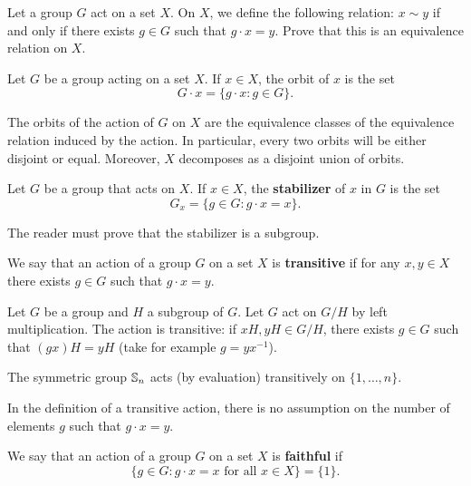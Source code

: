 \begin{exercise}
    Let a group $G$ act on a set $X$. 
    On $X$, we define the following relation: $x\sim y$ if and only if
    there exists $g\in G$ such that $g\cdot x=y$. Prove 
    that this is an equivalence relation on $X$. 
\end{exercise}

\begin{definition}
Let $G$ be a group acting on a set $X$. If $x\in X$, the
orbit of $x$ is the set
\[
G\cdot x=\{g\cdot x:g\in G\}.
\]
\end{definition}

The orbits of the action of $G$ on $X$ are 
the equivalence classes of the equivalence 
relation induced by the action. In particular, 
every two orbits will be either disjoint or equal. Moreover, 
$X$ decomposes as a disjoint union of orbits. 

\begin{definition}
        Let $G$ be a group that acts on $X$. If $x\in X$, the \textbf{stabilizer} of $x$ in $G$
        is the set   
        \[
        G_x=\{g\in G:g\cdot x=x\}.
        \]
\end{definition}

The reader must prove that the stabilizer is a subgroup. 

\begin{definition}
We say that an action of a group $G$ on a set $X$
is \textbf{transitive} if for any $x,y\in X$ there exists $g\in G$ such that $g\cdot x=y$.
\end{definition}

\begin{example}
    Let $G$ be a group and $H$ a subgroup of $G$. Let $G$ act
    on $G/H$ by left multiplication. The action is transitive: if 
    $xH,yH\in G/H$, there exists $g\in G$ such that
    $(gx)H=yH$ (take for example $g=yx^{-1}$). 
\end{example}

\begin{example}
The symmetric group $\mathbb{S}_n$ acts (by evaluation) transitively 
on $\{1,\dots,n\}$.
\end{example}

In the definition of a transitive action, there is no assumption
on the number of elements $g$ such that $g\cdot x=y$.

\begin{definition}
We say that an action of a group $G$ on a set 
$X$ is \textbf{faithful} if 
\[
\{g\in G:g\cdot x=x\text{ for all $x\in X$}\}=\{1\}.
\]
\end{definition}

